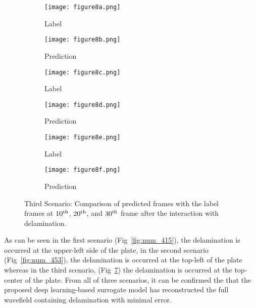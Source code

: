 \begin{figure} []
	\centering
	\begin{subfigure}[b]{0.44\textwidth}
		\centering
		\texttt{[image: figure8a.png]}
		\caption{Label}
		\label{fig:num_462_label1}
	\end{subfigure}
	\hfill
	\begin{subfigure}[b]{0.44\textwidth}
		\centering
		\texttt{[image: figure8b.png]} 
		\caption{Prediction}
		\label{fig:num_462_pred1}
	\end{subfigure}
	\hfill
	\begin{subfigure}[b]{0.44\textwidth}
		\centering
		\texttt{[image: figure8c.png]}
		\caption{Label}
		\label{fig:num_462_label2}
	\end{subfigure}
	\hfill
	\begin{subfigure}[b]{0.44\textwidth}
		\centering
		\texttt{[image: figure8d.png]}
		\caption{Prediction}
		\label{fig:num_462_pred2}
	\end{subfigure}
	\hfill
	\begin{subfigure}[b]{0.44\textwidth}
		\centering
		\texttt{[image: figure8e.png]}
		\caption{Label}
		\label{fig:num_462_label3}
	\end{subfigure}
	\hfill	
	\begin{subfigure}[b]{0.44\textwidth}
		\centering
		\texttt{[image: figure8f.png]}
		\caption{Prediction }
		\label{fig:num_462_pred3}
	\end{subfigure}
	\hfill	
	\caption{Third Scenario: Comparison of predicted frames with the label 
		frames at $10\textsuperscript{th}$, $20\textsuperscript{th}$, and 
		$30\textsuperscript{th}$ frame after the interaction with delamination.}
	\label{fig:num_462}
\end{figure}
As can be seen in the first scenario (Fig~\ref{fig:num_415}), the delamination 
is occurred at the upper-left side of the plate, in the second scenario 
(Fig~\ref{fig:num_453}), the delamination is occurred at the top-left of the 
plate whereas in the third scenario, (Fig~\ref{fig:num_462}) the 
delamination is occurred at the top-center of the plate. 
From all of three scenarios, it can be confirmed the that the proposed 
deep learning-based surrogate model has reconstructed the full wavefield 
containing delamination with minimal error. 
